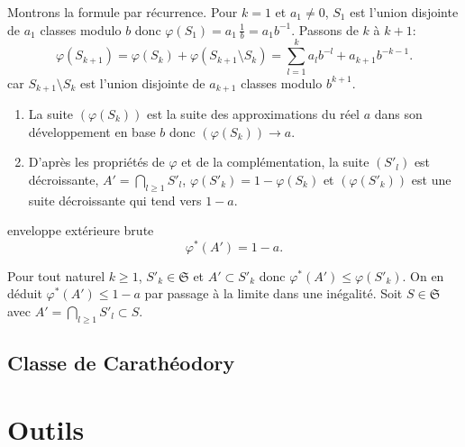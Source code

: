 \begin{demo}
Montrons la formule par récurrence.\newline
 Pour $k=1$ et $a_1 \neq 0$, $S_1$ est l'union disjointe de $a_1$ classes modulo $b$ donc $\varphi(S_1)= a_1\, \frac{1}{b} = a_1 b^{-1}$.\newline
Passons de $k$ à $k+1$:
\begin{displaymath}
 \varphi(S_{k+1}) = \varphi(S_k) + \varphi(S_{k+1} \setminus S_k)
 = \sum_{l=1}^k a_l b^{-l} + a_{k+1}b^{-k-1}.
\end{displaymath}
car $S_{k+1} \setminus S_k$ est l'union disjointe de $a_{k+1}$ classes modulo $b^{k+1}$.
\end{demo}
\begin{rems}
  \begin{enumerate}
   \item La suite $(\varphi(S_k))$ est la suite des approximations du réel $a$ dans son développement en base $b$ donc $(\varphi(S_k)) \rightarrow a$.
   \item D'après les propriétés de $\varphi$ et de la complémentation, la suite $(S'_l)$ est décroissante, $A' = \bigcap_{l\geq 1} S'_l$, $\varphi(S'_k) = 1 - \varphi(S_k)$ et
   $(\varphi(S'_k))$ est une suite décroissante qui tend vers $1-a$.
  \end{enumerate}
 \end{rems}
\begin{prop}{enveloppe extérieure brute}
 \begin{displaymath}
  \varphi^*(A') = 1 - a .
 \end{displaymath}
\end{prop}
\begin{demo}
 Pour tout naturel $k\geq 1$, $S'_k \in \mathfrak{S}$ et $A' \subset S'_k$ donc $\varphi^*(A') \leq \varphi(S'_k)$. On en déduit $\varphi^*(A') \leq 1-a$ par passage à la limite dans une inégalité.\newline
 Soit $S \in \mathfrak{S}$ avec  $A'= \bigcap_{l\geq 1} S'_l \subset S$.
\end{demo}


\section{Classe de Carathéodory} \label{Sec:ClasseCaratheodory}



\chapter{Outils} \label{Chap:Outils}

